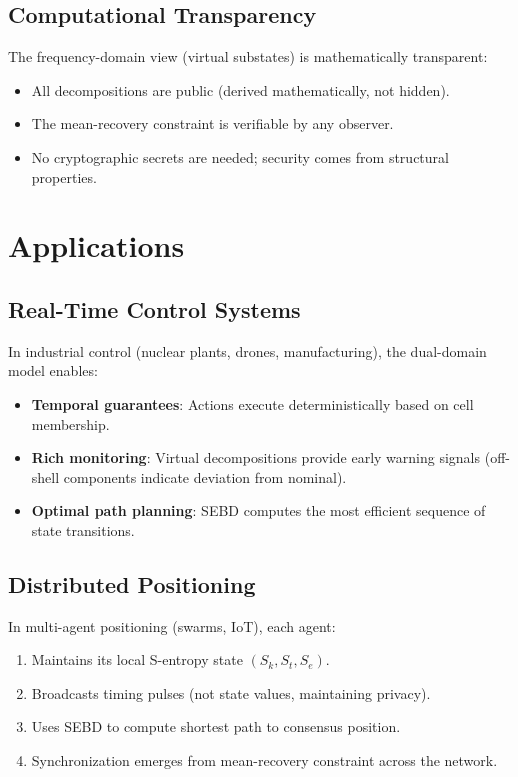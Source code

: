 \documentclass[twocolumn,11pt,a4paper]{article}
\newcommand{\Sk}{S_k}
\newcommand{\St}{S_t}
\newcommand{\Se}{S_e}
\begin{document}
\subsection{Computational Transparency}

The frequency-domain view (virtual substates) is mathematically transparent:
\begin{itemize}[nosep,leftmargin=1em]
  \item All decompositions are public (derived mathematically, not hidden).
  \item The mean-recovery constraint is verifiable by any observer.
  \item No cryptographic secrets are needed; security comes from structural properties.
\end{itemize}

\section{Applications}
\label{sec:applications}

\subsection{Real-Time Control Systems}

In industrial control (nuclear plants, drones, manufacturing), the dual-domain model enables:
\begin{itemize}[nosep,leftmargin=1em]
  \item \textbf{Temporal guarantees}: Actions execute deterministically based on cell membership.
  \item \textbf{Rich monitoring}: Virtual decompositions provide early warning signals (off-shell components indicate deviation from nominal).
  \item \textbf{Optimal path planning}: SEBD computes the most efficient sequence of state transitions.
\end{itemize}

\subsection{Distributed Positioning}

In multi-agent positioning (swarms, IoT), each agent:
\begin{enumerate}[nosep]
  \item Maintains its local S-entropy state $(\Sk, \St, \Se)$.
  \item Broadcasts timing pulses (not state values, maintaining privacy).
  \item Uses SEBD to compute shortest path to consensus position.
  \item Synchronization emerges from mean-recovery constraint across the network.
\end{enumerate}
\end{document}

